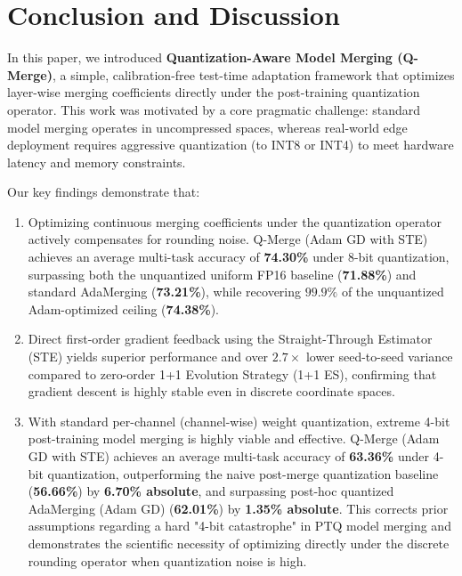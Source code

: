 \section{Conclusion and Discussion}
\label{sec:conclusion}

In this paper, we introduced \textbf{Quantization-Aware Model Merging (Q-Merge)}, a simple, calibration-free test-time adaptation framework that optimizes layer-wise merging coefficients directly under the post-training quantization operator. This work was motivated by a core pragmatic challenge: standard model merging operates in uncompressed spaces, whereas real-world edge deployment requires aggressive quantization (to INT8 or INT4) to meet hardware latency and memory constraints.

Our key findings demonstrate that:
\begin{enumerate}
    \item Optimizing continuous merging coefficients under the quantization operator actively compensates for rounding noise. Q-Merge (Adam GD with STE) achieves an average multi-task accuracy of \textbf{74.30\%} under 8-bit quantization, surpassing both the unquantized uniform FP16 baseline (\textbf{71.88\%}) and standard AdaMerging (\textbf{73.21\%}), while recovering $99.9\%$ of the unquantized Adam-optimized ceiling (\textbf{74.38\%}).
    \item Direct first-order gradient feedback using the Straight-Through Estimator (STE) yields superior performance and over $2.7\times$ lower seed-to-seed variance compared to zero-order 1+1 Evolution Strategy (1+1 ES), confirming that gradient descent is highly stable even in discrete coordinate spaces.
    \item With standard per-channel (channel-wise) weight quantization, extreme 4-bit post-training model merging is highly viable and effective. Q-Merge (Adam GD with STE) achieves an average multi-task accuracy of \textbf{63.36\%} under 4-bit quantization, outperforming the naive post-merge quantization baseline (\textbf{56.66\%}) by \textbf{6.70\% absolute}, and surpassing post-hoc quantized AdaMerging (Adam GD) (\textbf{62.01\%}) by \textbf{1.35\% absolute}. This corrects prior assumptions regarding a hard "4-bit catastrophe" in PTQ model merging and demonstrates the scientific necessity of optimizing directly under the discrete rounding operator when quantization noise is high.
\end{enumerate}


